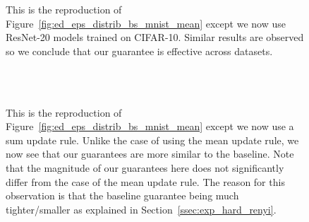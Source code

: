 \begin{figure}[t]
\centering
{}


\caption{This is the reproduction of Figure~\ref{fig:ed_eps_distrib_bs_mnist_mean} except we now use ResNet-20 models trained on CIFAR-10. Similar results are observed so we conclude that our guarantee is effective across datasets.
}
\label{fig:ed_eps_distrib_bs_cifar_mean}
\end{figure}

\begin{figure}[t]
\centering
{}
\\
\\
\caption{This is the reproduction of Figure~\ref{fig:ed_eps_distrib_bs_mnist_mean} except we now use a sum update rule. Unlike the case of using the mean update rule, we now see that our guarantees are more similar to the baseline. Note that the magnitude of our guarantees here does not significantly differ from the case of the mean update rule. The reason for this observation is that the baseline guarantee being much tighter/smaller as explained in Section~\ref{ssec:exp_hard_renyi}.
}
\label{fig:ed_eps_distrib_bs_mnist_sum}
\end{figure}


